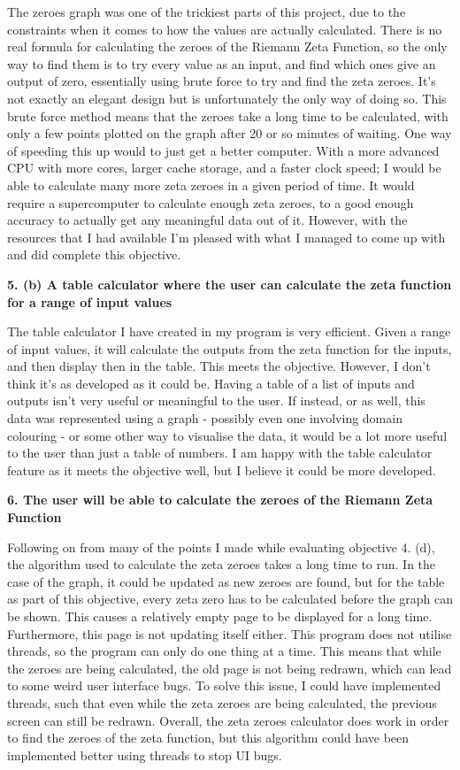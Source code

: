 \documentclass[12pt]{article}
\begin{document}
The zeroes graph was one of the trickiest parts of this project, due to the constraints when it comes to how the values are actually calculated. There is no real formula for calculating the zeroes of the Riemann Zeta Function, so the only way to find them is to try every value as an input, and find which ones give an output of zero, essentially using brute force to try and find the zeta zeroes. It's not exactly an elegant design but is unfortunately the only way of doing so. This brute force method means that the zeroes take a long time to be calculated, with only a few points plotted on the graph after 20 or so minutes of waiting. One way of speeding this up would to just get a better computer. With a more advanced CPU with more cores, larger cache storage, and a faster clock speed; I would be able to calculate many more zeta zeroes in a given period of time. It would require a supercomputer to calculate enough zeta zeroes, to a good enough accuracy to actually get any meaningful data out of it. However, with the resources that I had available I'm pleased with what I managed to come up with and did complete this objective.

\textbf{5. (b) A table calculator where the user can calculate the zeta function for a range of input values}

The table calculator I have created in my program is very efficient. Given a range of input values, it will calculate the outputs from the zeta function for the inputs, and then display then in the table. This meets the objective. However, I don't think it's as developed as it could be. Having a table of a list of inputs and outputs isn't very useful or meaningful to the user. If instead, or as well, this data was represented using a graph - possibly even one involving domain colouring - or some other way to visualise the data, it would be a lot more useful to the user than just a table of numbers. I am happy with the table calculator feature as it meets the objective well, but I believe it could be more developed.


\textbf{6. The user will be able to calculate the zeroes of the Riemann Zeta Function}

Following on from many of the points I made while evaluating objective 4. (d), the algorithm used to calculate the zeta zeroes takes a long time to run. In the case of the graph, it could be updated as new zeroes are found, but for the table as part of this objective, every zeta zero has to be calculated before the graph can be shown. This causes a relatively empty page to be displayed for a long time. Furthermore, this page is not updating itself either. This program does not utilise threads, so the program can only do one thing at a time. This means that while the zeroes are being calculated, the old page is not being redrawn, which can lead to some weird user interface bugs. To solve this issue, I could have implemented threads, such that even while the zeta zeroes are being calculated, the previous screen can still be redrawn. Overall, the zeta zeroes calculator does work in order to find the zeroes of the zeta function, but this algorithm could have been implemented better using threads to stop UI bugs.
\end{document}
